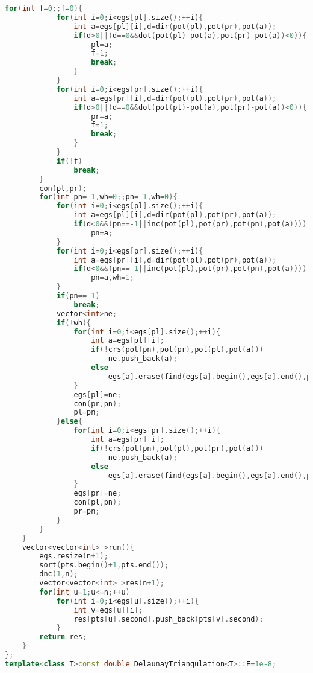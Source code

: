 \documentclass{book}
\begin{document}
\begin{lstlisting}[language=C++,title={Delaunay Triangulation.hpp (4889 bytes, 159 lines)}]
        for(int f=0;;f=0){
            for(int i=0;i<egs[pl].size();++i){
                int a=egs[pl][i],d=dir(pot(pl),pot(pr),pot(a));
                if(d>0||(d==0&&dot(pot(pl)-pot(a),pot(pr)-pot(a))<0)){
                    pl=a;
                    f=1;
                    break;
                }
            }
            for(int i=0;i<egs[pr].size();++i){
                int a=egs[pr][i],d=dir(pot(pl),pot(pr),pot(a));
                if(d>0||(d==0&&dot(pot(pl)-pot(a),pot(pr)-pot(a))<0)){
                    pr=a;
                    f=1;
                    break;
                }
            }
            if(!f)
                break;
        }
        con(pl,pr);
        for(int pn=-1,wh=0;;pn=-1,wh=0){
            for(int i=0;i<egs[pl].size();++i){
                int a=egs[pl][i],d=dir(pot(pl),pot(pr),pot(a));
                if(d<0&&(pn==-1||inc(pot(pl),pot(pr),pot(pn),pot(a))))
                    pn=a;
            }
            for(int i=0;i<egs[pr].size();++i){
                int a=egs[pr][i],d=dir(pot(pl),pot(pr),pot(a));
                if(d<0&&(pn==-1||inc(pot(pl),pot(pr),pot(pn),pot(a))))
                    pn=a,wh=1;
            }
            if(pn==-1)
                break;
            vector<int>ne;
            if(!wh){
                for(int i=0;i<egs[pl].size();++i){
                    int a=egs[pl][i];
                    if(!crs(pot(pn),pot(pr),pot(pl),pot(a)))
                        ne.push_back(a);
                    else
                        egs[a].erase(find(egs[a].begin(),egs[a].end(),pl));
                }
                egs[pl]=ne;
                con(pr,pn);
                pl=pn;
            }else{
                for(int i=0;i<egs[pr].size();++i){
                    int a=egs[pr][i];
                    if(!crs(pot(pn),pot(pl),pot(pr),pot(a)))
                        ne.push_back(a);
                    else
                        egs[a].erase(find(egs[a].begin(),egs[a].end(),pr));
                }
                egs[pr]=ne;
                con(pl,pn);
                pr=pn;
            }
        }
    }
    vector<vector<int> >run(){
        egs.resize(n+1);
        sort(pts.begin()+1,pts.end());
        dnc(1,n);
        vector<vector<int> >res(n+1);
        for(int u=1;u<=n;++u)
            for(int i=0;i<egs[u].size();++i){
                int v=egs[u][i];
                res[pts[u].second].push_back(pts[v].second);
            }
        return res;
    }
};
template<class T>const double DelaunayTriangulation<T>::E=1e-8;
\end{lstlisting}
\end{document}

